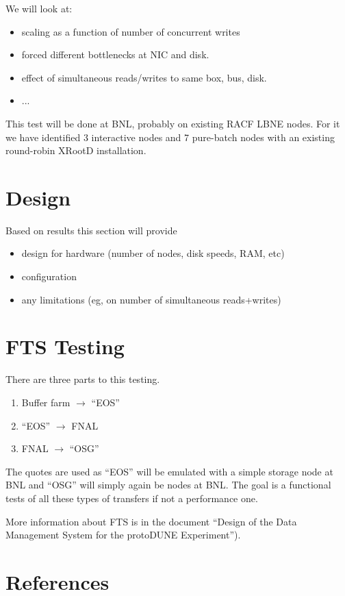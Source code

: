 \documentclass[pdftex,12pt,letter]{article}
\begin{document}
We will look at:

\begin{itemize}
\item scaling as a function of number of concurrent writes 
\item forced different bottlenecks at NIC and disk.
\item effect of simultaneous reads/writes to same box, bus, disk. 
\item ...
\end{itemize}

This test will be done at BNL, probably on existing RACF LBNE nodes.
For it we have identified 3 interactive nodes and 7 pure-batch nodes
with an existing round-robin XRootD installation.

\section{Design}

Based on results this section will provide 
\begin{itemize}
\item design for hardware (number of nodes, disk speeds, RAM, etc)
\item configuration
\item any limitations (eg, on number of simultaneous reads+writes)
\end{itemize}

\section{FTS Testing}

There are three parts to this testing.

\begin{enumerate}
\item Buffer farm $\to$ ``EOS''
\item ``EOS'' $\to$ FNAL
\item FNAL $\to$ ``OSG''
\end{enumerate}

The quotes are used as ``EOS'' will be emulated with a simple storage
node at BNL and ``OSG'' will simply again be nodes at BNL.  The goal
is a functional tests of all these types of transfers if not a
performance one.

More information about FTS is in the document ``Design of the Data
Management System for the protoDUNE Experiment'').

\section{References}

\end{document}
